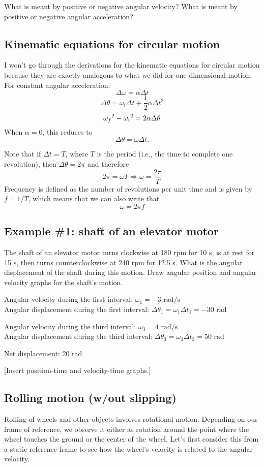 What is meant by positive or negative angular velocity? What is meant by positive or negative angular acceleration?
 
\subsection{Kinematic equations for circular motion}
I won't go through the derivations for the kinematic equations for circular motion because they are exactly analogous to what we did for one-dimensional motion. For constant angular acceleration:
$$\Delta\omega=\alpha\Delta{t}$$
$$\Delta\theta=\omega_i\Delta{t}+\frac{1}{2}\alpha\Delta{t}^2$$
$$\omega_f\displaystyle^2-\omega_i\displaystyle^2=2\alpha\Delta\theta$$
When $\alpha=0$, this reduces to
$$\Delta\theta=\omega\Delta{t}.$$

Note that if $\Delta t=T$, where $T$ is the period (i.e., the time to complete one revolution), then $\Delta \theta = 2\pi$ and therefore
$$2\pi = \omega T \Rightarrow \omega = \frac{2\pi}{T}$$
Frequency is defined as the number of revolutions per unit time and is given by $f=1/T$, which means that we can also write that
$$\omega = 2\pi f$$

\subsection{Example \#1: shaft of an elevator motor}
The shaft of an elevator motor turns clockwise at 180 rpm for 10 s, is at rest for 15 s, then turns counterclockwise at 240 rpm for 12.5 s. What is the angular displacement of the shaft during this motion. Draw angular position and angular velocity graphs for the shaft's motion.

Angular velocity during the first interval: $\omega_1=-3\mbox{ rad/s}$\\
Angular displacement during the first interval: $\Delta\theta_1=\omega_1\Delta{t_1}=-30\mbox{ rad}$

Angular velocity during the third interval: $\omega_3=4\mbox{ rad/s}$\\
Angular displacement during the third interval: $\Delta\theta_3=\omega_3\Delta{t_3}=50\mbox{ rad}$

Net displacement: 20 rad

[Insert position-time and velocity-time graphs.]

\clearpage
\subsection{Rolling motion (w/out slipping)}
Rolling of wheels and other objects involves rotational motion. Depending on our frame of reference, we observe it either as rotation around the point where the wheel touches the ground or the center of the wheel. Let's first consider this from a static reference frame to see how the wheel's velocity is related to the angular velocity.

